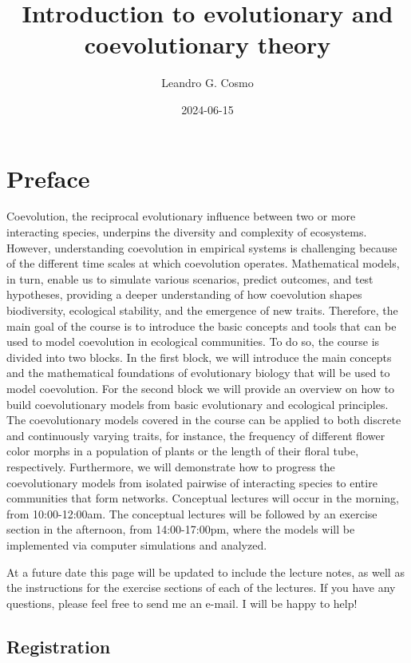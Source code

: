 \documentclass[
]{book}
\title{Introduction to evolutionary and coevolutionary theory}
\author{Leandro G. Cosmo}
\date{2024-06-15}
\begin{document}
\maketitle

{
\setcounter{tocdepth}{1}
\tableofcontents
}
\hypertarget{preface}{%
\chapter{Preface}\label{preface}}

Coevolution, the reciprocal evolutionary influence between two or more interacting species, underpins the diversity and complexity of ecosystems. However, understanding coevolution in empirical systems is challenging because of the different time scales at which coevolution operates. Mathematical models, in turn, enable us to simulate various scenarios, predict outcomes, and test hypotheses, providing a deeper understanding of how coevolution shapes biodiversity, ecological stability, and the emergence of new traits. Therefore, the main goal of the course is to introduce the basic concepts and tools that can be used to model coevolution in ecological communities. To do so, the course is divided into two blocks. In the first block, we will introduce the main concepts and the mathematical foundations of evolutionary biology that will be used to model coevolution. For the second block we will provide an overview on how to build coevolutionary models from basic evolutionary and ecological principles. The coevolutionary models covered in the course can be applied to both discrete and continuously varying traits, for instance, the frequency of different flower color morphs in a population of plants or the length of their floral tube, respectively. Furthermore, we will demonstrate how to progress the coevolutionary models from isolated pairwise of interacting species to entire communities that form networks. Conceptual lectures will occur in the morning, from 10:00-12:00am. The conceptual lectures will be followed by an exercise section in the afternoon, from 14:00-17:00pm, where the models will be implemented via computer simulations and analyzed.

At a future date this page will be updated to include the lecture notes, as well as the instructions for the exercise sections of each of the lectures. If you have any questions, please feel free to send me an e-mail. I will be happy to help!

\hypertarget{registration}{%
\section{Registration}\label{registration}}
\end{document}
